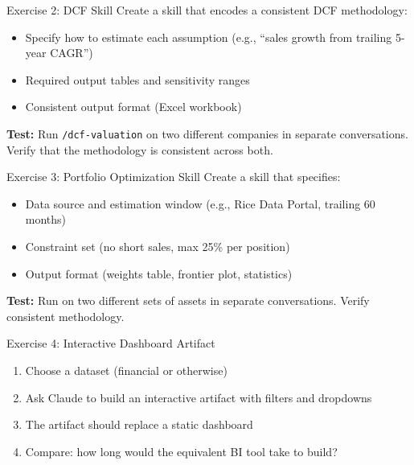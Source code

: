 \documentclass[aspectratio=169]{beamer}
\begin{document}
\begin{frame}{Exercise 2: DCF Skill}
Create a skill that encodes a consistent DCF methodology:
\begin{itemize}
  \item Specify how to estimate each assumption (e.g., ``sales growth from trailing 5-year CAGR'')
  \item Required output tables and sensitivity ranges
  \item Consistent output format (Excel workbook)
\end{itemize}
\vspace{0.3cm}
\textbf{Test:} Run \texttt{/dcf-valuation} on two different companies in separate conversations. Verify that the \alert{methodology is consistent} across both.
\end{frame}

\begin{frame}{Exercise 3: Portfolio Optimization Skill}
Create a skill that specifies:
\begin{itemize}
  \item Data source and estimation window (e.g., Rice Data Portal, trailing 60 months)
  \item Constraint set (no short sales, max 25\% per position)
  \item Output format (weights table, frontier plot, statistics)
\end{itemize}
\vspace{0.3cm}
\textbf{Test:} Run on two different sets of assets in separate conversations. Verify consistent methodology.
\end{frame}

\begin{frame}{Exercise 4: Interactive Dashboard Artifact}
\begin{enumerate}
  \item Choose a dataset (financial or otherwise)
  \item Ask Claude to build an interactive artifact with filters and dropdowns
  \item The artifact should replace a static dashboard
  \item Compare: how long would the equivalent BI tool take to build?
\end{enumerate}
\end{frame}
\end{document}
